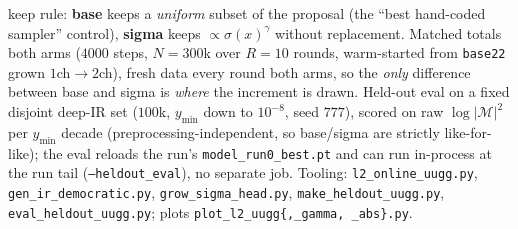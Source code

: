 \documentclass[11pt]{article}
\newcommand{\code}[1]{\texttt{#1}}
\begin{document}
keep rule: \textbf{base} keeps a \emph{uniform} subset of the proposal (the ``best hand-coded
sampler'' control), \textbf{sigma} keeps $\propto\!\sigma(x)^\gamma$ without replacement. Matched
totals both arms ($4000$ steps, $N{=}300$k over $R{=}10$ rounds, warm-started from \code{base22} grown
$1$ch$\to$$2$ch), fresh data every round both arms, so the \emph{only} difference between base and
sigma is \emph{where} the increment is drawn. Held-out eval on a fixed disjoint deep-IR set ($100$k,
$y_{\min}$ down to $10^{-8}$, seed $777$), scored on raw $\log|\mathcal{M}|^2$ per $y_{\min}$ decade
(preprocessing-independent, so base/sigma are strictly like-for-like); the eval reloads the run's
\code{model\_run0\_best.pt} and can run in-process at the run tail (\code{--heldout\_eval}), no separate
job. Tooling: \code{l2\_online\_uugg.py}, \code{gen\_ir\_democratic.py}, \code{grow\_sigma\_head.py},
\code{make\_heldout\_uugg.py}, \code{eval\_heldout\_uugg.py}; plots \code{plot\_l2\_uugg\{,\_gamma,
\_abs\}.py}.
\end{document}
